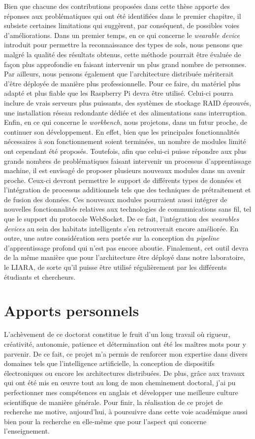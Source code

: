 Bien que chacune des contributions proposées dans cette thèse apporte des réponses aux problématiques qui ont été identifiées dans le premier chapitre, il subsiste certaines limitations qui suggèrent, par conséquent, de possibles voies d'améliorations. Dans un premier temps, en ce qui concerne le \textit{wearable device} introduit pour permettre la reconnaissance des types de sols, nous pensons que malgré la qualité des résultats obtenus, cette méthode pourrait être évaluée de façon plus approfondie en faisant intervenir un plus grand nombre de personnes. Par ailleurs, nous pensons également que l'architecture distribuée mériterait d'être déployée de manière plus professionnelle. Pour ce faire, du matériel plus adapté et plus fiable que les Raspberry Pi devra être utilisé. Celui-ci pourra inclure de vrais serveurs plus puissants, des systèmes de stockage \acs{RAID} éprouvés, une installation réseau redondante dédiée et des alimentations sans interruption. Enfin, en ce qui concerne le \textit{workbench}, nous projetons, dans un futur proche, de continuer son développement. En effet, bien que les principales fonctionnalités nécessaires à son fonctionnement soient terminées, un nombre de modules limité ont cependant été proposés. Toutefois, afin que celui-ci puisse répondre aux plus grands nombres de problématiques faisant intervenir un processus d'apprentissage machine, il est envisagé de proposer plusieurs nouveaux modules dans un avenir proche. Ceux-ci devront permettre le support de différents types de données et l'intégration de processus additionnels tels que des techniques de prétraitement et de fusion des données. Ces nouveaux modules pourraient aussi intégrer de nouvelles fonctionnalités relatives aux technologies de communications sans fil, tel que le support du protocole WebSocket. De ce fait, l'intégration des \textit{wearables devices} au sein des habitats intelligents s'en retrouverait encore améliorée. En outre, une autre considération sera portée sur la conception du \textit{pipeline} d'apprentissage profond qui n'est pas encore aboutie. Finalement, cet outil devra de la même manière que pour l'architecture être déployé dans notre laboratoire, le \acs{LIARA}, de sorte qu'il puisse être utilisé régulièrement par les différents étudiants et chercheurs.

\section{Apports personnels}

L'achèvement de ce doctorat constitue le fruit d'un long travail où rigueur, créativité, autonomie, patience et détermination ont été les maîtres mots pour y parvenir. De ce fait, ce projet m'a permis de renforcer mon expertise dans divers domaines tels que l’intelligence artificielle, la conception de dispositifs électroniques ou encore les architectures distribuées. De plus, grâce aux travaux qui ont été mis en \oe{}uvre tout au long de mon cheminement doctoral, j'ai pu perfectionner mes compétences en anglais et développer une meilleure culture scientifique de manière générale. Pour finir, la réalisation de ce projet de recherche me motive, aujourd'hui, à poursuivre dans cette voie académique aussi bien pour la recherche en elle-même que pour l'aspect qui concerne l'enseignement.
